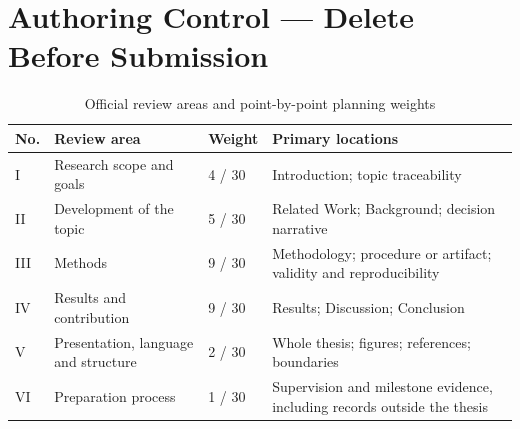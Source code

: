 \chapter*{Authoring Control --- Delete Before Submission}


\ResearchChain

\begin{table}[H]
  \centering
  \caption*{Official review areas and point-by-point planning weights}
  \begin{tabularx}{\textwidth}{@{}p{}X p{}X@{}}
    \toprule
    \textbf{No.} & \textbf{Review area} & \textbf{Weight} & \textbf{Primary locations} \\
    \midrule
    I & Research scope and goals & 4 / 30 & Introduction; topic traceability \\
    II & Development of the topic & 5 / 30 & Related Work; Background; decision narrative \\
    III & Methods & 9 / 30 & Methodology; procedure or artifact; validity and reproducibility \\
    IV & Results and contribution & 9 / 30 & Results; Discussion; Conclusion \\
    V & Presentation, language and structure & 2 / 30 & Whole thesis; figures; references; boundaries \\
    VI & Preparation process & 1 / 30 & Supervision and milestone evidence, including records outside the thesis \\
    \bottomrule
  \end{tabularx}
\end{table}

